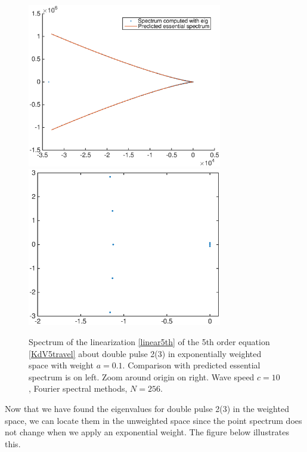 \documentclass[12pt]{article}
\begin{document}
\begin{figure}[H]
	\includegraphics[width=8.5cm]{four10ud2_3expwt}
	\includegraphics[width=8.5cm]{four10ud2_3expwt2}
	\caption{Spectrum of the linearization \eqref{linear5th} of the 5th order equation \eqref{KdV5travel} about double pulse 2(3) in exponentially weighted space with weight $a = 0.1$. Comparison with predicted essential spectrum is on left. Zoom around origin on right. Wave speed $c = 10$, Fourier spectral methods, $N = 256$.}
\end{figure}

Now that we have found the eigenvalues for double pulse 2(3) in the weighted space, we can locate them in the unweighted space since the point spectrum does not change when we apply an exponential weight. The figure below illustrates this.
\end{document}
